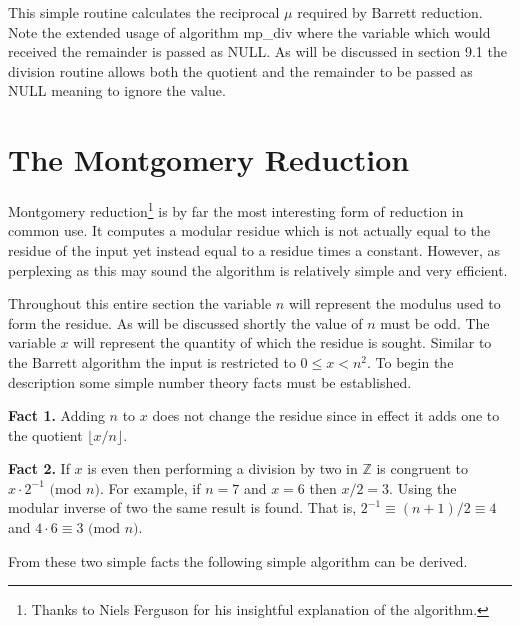 \documentclass[b5paper]{book}
\def\Z{{\mathbb Z}}
\begin{document}
This simple routine calculates the reciprocal $\mu$ required by Barrett reduction.  Note the extended usage of algorithm mp\_div where the variable
which would received the remainder is passed as NULL.  As will be discussed in section 9.1 the division routine allows both the quotient and the 
remainder to be passed as NULL meaning to ignore the value.  

\section{The Montgomery Reduction}
Montgomery reduction\footnote{Thanks to Niels Ferguson for his insightful explanation of the algorithm.} \cite{MONT} is by far the most interesting 
form of reduction in common use.  It computes a modular residue which is not actually equal to the residue of the input yet instead equal to a 
residue times a constant.  However, as perplexing as this may sound the algorithm is relatively simple and very efficient.  

Throughout this entire section the variable $n$ will represent the modulus used to form the residue.  As will be discussed shortly the value of
$n$ must be odd.  The variable $x$ will represent the quantity of which the residue is sought.  Similar to the Barrett algorithm the input
is restricted to $0 \le x < n^2$.  To begin the description some simple number theory facts must be established.

\textbf{Fact 1.}  Adding $n$ to $x$ does not change the residue since in effect it adds one to the quotient $\lfloor x / n \rfloor$.

\textbf{Fact 2.}  If $x$ is even then performing a division by two in $\Z$ is congruent to $x \cdot 2^{-1} \mbox{ (mod }n\mbox{)}$.  For example,
if $n = 7$ and $x = 6$ then $x/2 = 3$.  Using the modular inverse of two the same result is found.  That is, $2^{-1} \equiv (n+1)/2 \equiv 4$ and
$4 \cdot 6 \equiv 3 \mbox{ (mod }n\mbox{)}$.  

From these two simple facts the following simple algorithm can be derived.
\end{document}
